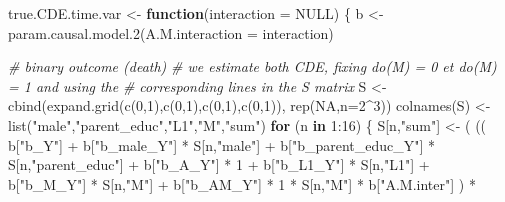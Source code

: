 \documentclass[
]{book}
\newenvironment{Shaded}{\begin{snugshade}}{\end{snugshade}}
\newcommand{\AttributeTok}[1]{\textcolor[rgb]{0.77,0.63,0.00}{#1}}
\newcommand{\CommentTok}[1]{\textcolor[rgb]{0.56,0.35,0.01}{\textit{#1}}}
\newcommand{\ConstantTok}[1]{\textcolor[rgb]{0.00,0.00,0.00}{#1}}
\newcommand{\ControlFlowTok}[1]{\textcolor[rgb]{0.13,0.29,0.53}{\textbf{#1}}}
\newcommand{\DecValTok}[1]{\textcolor[rgb]{0.00,0.00,0.81}{#1}}
\newcommand{\FunctionTok}[1]{\textcolor[rgb]{0.00,0.00,0.00}{#1}}
\newcommand{\NormalTok}[1]{#1}
\newcommand{\OtherTok}[1]{\textcolor[rgb]{0.56,0.35,0.01}{#1}}
\newcommand{\SpecialCharTok}[1]{\textcolor[rgb]{0.00,0.00,0.00}{#1}}
\newcommand{\StringTok}[1]{\textcolor[rgb]{0.31,0.60,0.02}{#1}}
\begin{document}
\begin{Shaded}
\begin{Highlighting}[]
\NormalTok{true.CDE.time.var }\OtherTok{\textless{}{-}} \ControlFlowTok{function}\NormalTok{(}\AttributeTok{interaction =} \ConstantTok{NULL}\NormalTok{) \{}
\NormalTok{  b }\OtherTok{\textless{}{-}} \FunctionTok{param.causal.model.2}\NormalTok{(}\AttributeTok{A.M.interaction =}\NormalTok{ interaction)}
  
  \CommentTok{\# binary outcome (death)}
  \CommentTok{\# we estimate both CDE, fixing do(M) = 0 et do(M) = 1 and using the }
  \CommentTok{\# corresponding lines in the S matrix}
\NormalTok{  S }\OtherTok{\textless{}{-}} \FunctionTok{cbind}\NormalTok{(}\FunctionTok{expand.grid}\NormalTok{(}\FunctionTok{c}\NormalTok{(}\DecValTok{0}\NormalTok{,}\DecValTok{1}\NormalTok{),}\FunctionTok{c}\NormalTok{(}\DecValTok{0}\NormalTok{,}\DecValTok{1}\NormalTok{),}\FunctionTok{c}\NormalTok{(}\DecValTok{0}\NormalTok{,}\DecValTok{1}\NormalTok{),}\FunctionTok{c}\NormalTok{(}\DecValTok{0}\NormalTok{,}\DecValTok{1}\NormalTok{)), }\FunctionTok{rep}\NormalTok{(}\ConstantTok{NA}\NormalTok{,}\AttributeTok{n=}\DecValTok{2}\SpecialCharTok{\^{}}\DecValTok{3}\NormalTok{))}
  \FunctionTok{colnames}\NormalTok{(S) }\OtherTok{\textless{}{-}} \FunctionTok{list}\NormalTok{(}\StringTok{"male"}\NormalTok{,}\StringTok{"parent\_educ"}\NormalTok{,}\StringTok{"L1"}\NormalTok{,}\StringTok{"M"}\NormalTok{,}\StringTok{"sum"}\NormalTok{)}
  \ControlFlowTok{for}\NormalTok{ (n }\ControlFlowTok{in} \DecValTok{1}\SpecialCharTok{:}\DecValTok{16}\NormalTok{) \{}
\NormalTok{    S[n,}\StringTok{"sum"}\NormalTok{] }\OtherTok{\textless{}{-}}\NormalTok{ ( (( b[}\StringTok{"b\_Y"}\NormalTok{] }\SpecialCharTok{+} 
\NormalTok{                        b[}\StringTok{"b\_male\_Y"}\NormalTok{] }\SpecialCharTok{*}\NormalTok{ S[n,}\StringTok{"male"}\NormalTok{] }\SpecialCharTok{+} 
\NormalTok{                        b[}\StringTok{"b\_parent\_educ\_Y"}\NormalTok{] }\SpecialCharTok{*}\NormalTok{ S[n,}\StringTok{"parent\_educ"}\NormalTok{] }\SpecialCharTok{+} 
\NormalTok{                        b[}\StringTok{"b\_A\_Y"}\NormalTok{] }\SpecialCharTok{*} \DecValTok{1} \SpecialCharTok{+} 
\NormalTok{                        b[}\StringTok{"b\_L1\_Y"}\NormalTok{] }\SpecialCharTok{*}\NormalTok{ S[n,}\StringTok{"L1"}\NormalTok{] }\SpecialCharTok{+}
\NormalTok{                        b[}\StringTok{"b\_M\_Y"}\NormalTok{] }\SpecialCharTok{*}\NormalTok{ S[n,}\StringTok{"M"}\NormalTok{] }\SpecialCharTok{+}
\NormalTok{                        b[}\StringTok{"b\_AM\_Y"}\NormalTok{] }\SpecialCharTok{*} \DecValTok{1} \SpecialCharTok{*}\NormalTok{ S[n,}\StringTok{"M"}\NormalTok{] }\SpecialCharTok{*}\NormalTok{ b[}\StringTok{"A.M.inter"}\NormalTok{] ) }\SpecialCharTok{*}

\end{Highlighting}
\end{Shaded}
\end{document}
